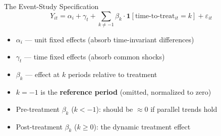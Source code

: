 \begin{frame}{The Event-Study Specification}
  \begin{equation*}
    Y_{it} = \alpha_i + \gamma_t + \sum_{k \neq -1} \beta_k \cdot \mathbf{1}[\text{time-to-treat}_{it} = k] + \varepsilon_{it}
  \end{equation*}

  \vspace{4pt}

  \begin{itemize}
    \item $\alpha_i$ --- unit fixed effects (absorb time-invariant differences)
    \item $\gamma_t$ --- time fixed effects (absorb common shocks)
    \item $\beta_k$ --- effect at $k$ periods relative to treatment
    \item $k = -1$ is the \textbf{reference period} (omitted, normalized to zero)
    \item Pre-treatment $\beta_k$ ($k < -1$): should be $\approx 0$ if parallel trends hold
    \item Post-treatment $\beta_k$ ($k \geq 0$): the dynamic treatment effect
  \end{itemize}
\end{frame}

